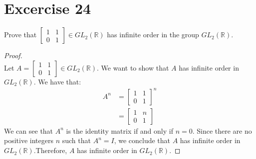 \documentclass{article}
\begin{document}
    \section*{Excercise 24}
    Prove that $\begin{bmatrix}
        1 & 1 \\
        0 & 1
    \end{bmatrix} \in GL_2(\mathbb{R})$ has infinite order in the group $GL_2(\mathbb{R})$.
   \begin{proof}
        \leavevmode \\
        Let $A = \begin{bmatrix}
            1 & 1 \\
            0 & 1
        \end{bmatrix} \in GL_2(\mathbb{R})$. We want to show that $A$ has infinite order in $GL_2(\mathbb{R})$. We have that:
        \begin{align*}
            A^n &= \begin{bmatrix}
                1 & 1 \\
                0 & 1
            \end{bmatrix}^n \\
            &= \begin{bmatrix}
                1 & n \\
                0 & 1
            \end{bmatrix}
        \end{align*}
        We can see that $A^n$ is the identity matrix if and only if $n = 0$.  Since there are no positive integers \(n\) such that \(A^n = I\), we conclude that \(A\) has infinite order in \(GL_2(\mathbb{R})\).Therefore, $A$ has infinite order in $GL_2(\mathbb{R})$.
        
   \end{proof}
\end{document}
